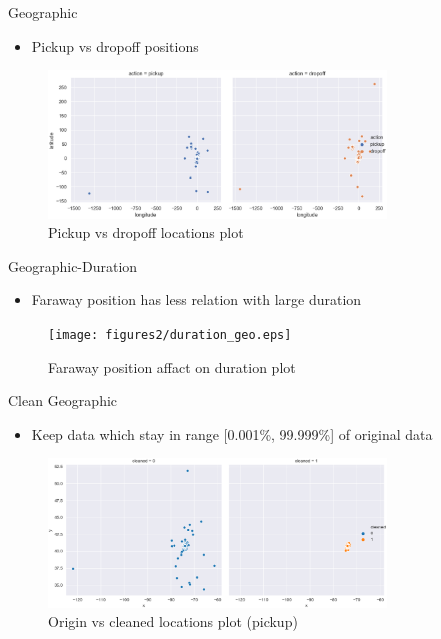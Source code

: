 \documentclass[
 size=12pt,
 paper=smartboard, %
 mode=present, %
 display=slides, %
style=tuliplab,
pauseslide,
fleqn,leqno]{powerdot}
\begin{document}
\begin{slide}{Geographic}
  \begin{itemize}
    \item Pickup vs dropoff positions
  \end{itemize}
  \begin{figure}[h]
    \centering
    \includegraphics[width=0.8\textwidth]{figures2/action_geo.eps}
    \caption{Pickup vs dropoff locations plot}
    \label{fig:pickup-dropoff-position}
  \end{figure}
\end{slide}

\begin{slide}{Geographic-Duration}
  \begin{itemize}
    \item Faraway position has less relation with large duration 
  \end{itemize}
  \begin{figure}[h]
    \centering
    \texttt{[image: figures2/duration\_geo.eps]}
    \caption{Faraway position affact on duration plot}
    \label{fig:geographic-duration}
  \end{figure}
\end{slide}

\begin{slide}{Clean Geographic}
  \begin{itemize}
    \item Keep data which stay in range [0.001\%, 99.999\%] of original data
  \end{itemize}
  \begin{figure}[h]
    \centering
    \includegraphics[width=0.8\textwidth]{figures2/cleaned_position.eps}
    \caption{Origin vs cleaned locations plot (pickup)}
    \label{fig:cleaning-geographic}
  \end{figure}
\end{slide}
\end{document}
